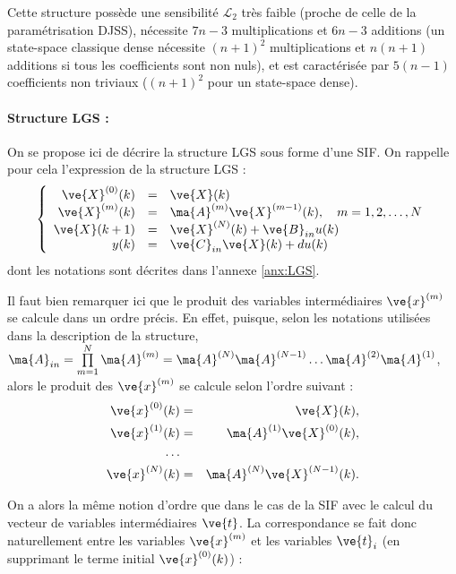 Cette structure possède une sensibilité $\mathcal{L}_2$ très faible (proche de celle de la paramétrisation DJSS), nécessite $7n-3$ multiplications et $6n-3$ additions (un state-space classique dense nécessite $(n+1)^2$ multiplications et $n(n+1)$ additions si tous les coefficients sont non nuls), et est caractérisée par $5(n-1)$ coefficients non triviaux ($(n+1)^2$ pour un state-space dense).


\paragraph{Structure LGS :}

On se propose ici de décrire la structure LGS sous forme d'une SIF. On rappelle pour cela l'expression de la structure LGS :
\begin{equation*}
\left \{
\begin{array}{rcl}
\ve{X}^{(0)}(k)&=&\ve{X}(k)\\
\ve{X}^{(m)}(k) & = & \ma{A}^{(m)}\ve{X}^{(m-1)}(k), \quad m=1,2,\ldots,N\\
\ve{X}(k+1) & = & \ve{X}^{(N)}(k)+\ve{B}_{in}u(k) \\
y(k)& = & \ve{C}_{in}\ve{X}(k)+du(k)\\
\end{array}
\right .
\end{equation*}
dont les notations sont décrites dans l'annexe \ref{anx:LGS}.

Il faut bien remarquer ici que le produit des variables intermédiaires $\ve{x}^{(m)}$ se calcule dans un ordre précis. En effet, puisque, selon les notations utilisées dans la description de la structure, $\ma{A}_{in} = \prod\limits_{m=1}^N \ma{A}^{(m)} =\ma{A}^{(N)}\ma{A}^{(N-1)}\ldots \ma{A}^{(2)}\ma{A}^{(1)}$, alors le produit des $\ve{x}^{(m)}$ se calcule selon l'ordre suivant :
\begin{eqnarray}
	\ve{x}^{(0)}(k) &=& \ve{X}(k),\\
	\ve{x}^{(1)}(k) &=& \ma{A}^{(1)}\ve{X}^{(0)}(k),\\
	\ldots\\
	\ve{x}^{(N)}(k) &=& \ma{A}^{(N)}\ve{X}^{(N-1)}(k).
\end{eqnarray}

On a alors la même notion d'ordre que dans le cas de la SIF avec le calcul du vecteur de variables intermédiaires $\ve{t}$. La correspondance se fait donc naturellement entre les variables $\ve{x}^{(m)}$ et les variables $\ve{t}_i$ (en supprimant le terme initial $\ve{x}^{(0)}(k)$) :


